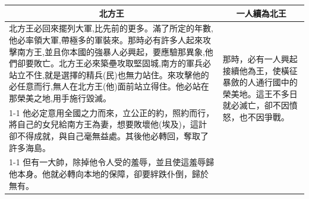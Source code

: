 \begin{table}[H]
\centering
\begin{tabular}{p{14.5cm}|p{2.50cm}}\hline\hline
\multicolumn{1}{c|}{北方王}&\multicolumn{1}{c}{一人續為北王}\\\hline
北方王必回來擺列大軍,比先前的更多。滿了所定的年數,他必率領大軍,帶極多的軍裝來。那時必有許多人起來攻擊南方王,並且你本國的強暴人必興起，要應驗那異象,他們卻要敗亡。北方王必來築壘攻取堅固城,南方的軍兵必站立不住,就是選擇的精兵(民)也無力站住。來攻擊他的必任意而行,無人在北方王(他)面前站立得住。他必站在那榮美之地,用手施行毀滅。&\multirow{2}{2.85cm}{那時，必有一人興起接續他為王，使橫征暴斂的人通行國中的榮美地。這王不多日就必滅亡，卻不因憤怒，也不因爭戰。}\\\cline{1-1}
他必定意用全國之力而來，立公正的約，照約而行，將自己的女兒給南方王為妻，想要敗壞他(埃及)，這計卻不得成就，與自己毫無益處。其後他必轉回，奪取了許多海島。&\\\cline{1-1}
但有一大帥，除掉他令人受的羞辱，並且使這羞辱歸他本身。他就必轉向本地的保障，卻要絆跌仆倒，歸於無有。&\\\hline
\end{tabular}
\end{table}



